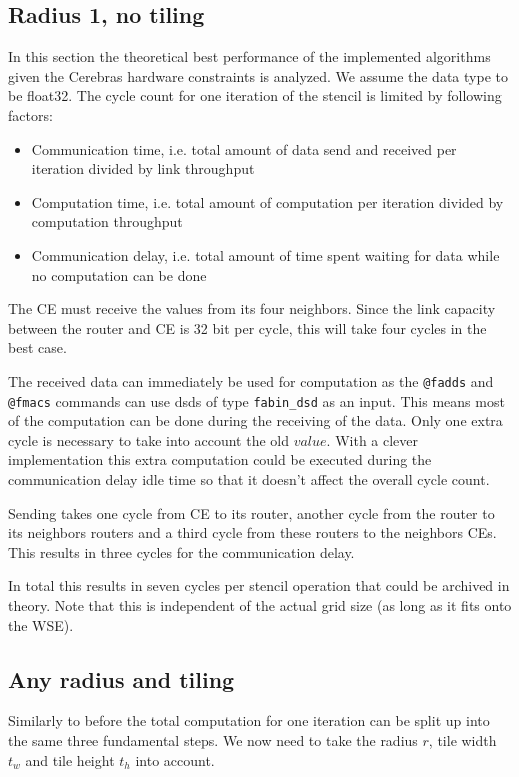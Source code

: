 \documentclass{article}
\begin{document}
\subsection{Radius 1, no tiling}
In this section the theoretical best performance of the implemented algorithms given the Cerebras hardware constraints is analyzed.
We assume the data type to be float32.
The cycle count for one iteration of the stencil is limited by following factors:
\begin{itemize}
    \item Communication time, i.e. total amount of data send and received per iteration divided by link throughput
    \item Computation time, i.e. total amount of computation per iteration divided by computation throughput
    \item Communication delay, i.e. total amount of time spent waiting for data while no computation can be done
\end{itemize}
The CE must receive the values from its four neighbors. Since the link capacity between the router and CE is 32 bit per cycle, this will take four cycles in the best case.

The received data can immediately be used for computation as the \texttt{@fadds} and \texttt{@fmacs} commands can use dsds of type \texttt{fabin\_dsd} as an input. This means most of the computation can be done during the receiving of the data. Only one extra cycle is necessary to take into account the old $value$. With a clever implementation this extra computation could be executed during the communication delay idle time so that it doesn't affect the overall cycle count.

Sending takes one cycle from CE to its router, another cycle from the router to its neighbors routers and a third cycle from these routers to the neighbors CEs. This results in three cycles for the communication delay.

In total this results in seven cycles per stencil operation that could be archived in theory.
Note that this is independent of the actual grid size (as long as it fits onto the WSE).


\subsection{Any radius and tiling}
Similarly to before the total computation for one iteration can be split up into the same three fundamental steps. We now need to take the radius $r$, tile width $t_w$ and tile height $t_h$ into account.
\end{document}
